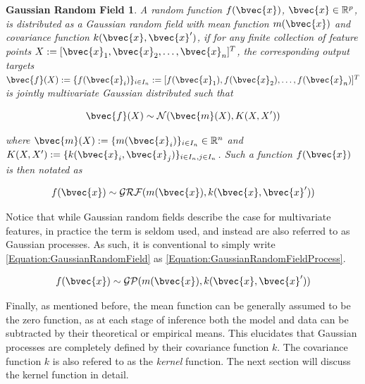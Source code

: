 			\newtheorem{grfdef}{Gaussian Random Field}[section]
			\begin{grfdef}
				A random function $f(\bvec{x})$, $\bvec{x} \in \mathbb{R}^{p}$, is distributed as a Gaussian random field with mean function $m(\bvec{x})$ and covariance function $k(\bvec{x}, \bvec{x}')$, if for any finite collection of feature points $X := [\bvec{x}_{1}, \bvec{x}_{2}, \dots, \bvec{x}_{n}]^{T}$, the corresponding output targets $\bvec{f}(X) := \{f(\bvec{x}_{i})\}_{i \in I_{n}} := [f(\bvec{x}_{1}), f(\bvec{x}_{2}), \dots, f(\bvec{x}_{n})]^{T}$ is jointly multivariate Gaussian distributed such that 

					\begin{equation}
						\bvec{f}(X) \sim \mathcal{N}(\bvec{m}(X), K(X, X'))
					\label{Equation:GaussianRandomFieldFiniteDistribution}
					\end{equation}	
				
				where $\bvec{m}(X) :=  \{m(\bvec{x}_{i})\}_{i \in I_{n}} \in \mathbb{R}^{n}$ and $K(X, X') := \{k(\bvec{x}_{i}, \bvec{x}_{j})\}_{i \in I_{n}, j \in I_{n}}$. Such a function $f(\bvec{x})$ is then notated as
				
					\begin{equation}
						f(\bvec{x}) \sim \mathcal{GRF}(m(\bvec{x}), k(\bvec{x}, \bvec{x}'))
					\label{Equation:GaussianRandomField}
					\end{equation}	
					
			\label{Definition:GaussianRandomField}
			\end{grfdef}
			
			Notice that while Gaussian random fields describe the case for multivariate features, in practice the term is seldom used, and instead are also referred to as Gaussian processes. As such, it is conventional to simply write \eqref{Equation:GaussianRandomField} as \eqref{Equation:GaussianRandomFieldProcess}.
	
				\begin{equation}
					f(\bvec{x}) \sim \mathcal{GP}(m(\bvec{x}), k(\bvec{x}, \bvec{x}'))
				\label{Equation:GaussianRandomFieldProcess}
				\end{equation}	
							
			Finally, as mentioned before, the mean function can be generally assumed to be the zero function, as at each stage of inference both the model and data can be subtracted by their theoretical or empirical means. This elucidates that Gaussian processes are completely defined by their covariance function $k$. The covariance function $k$ is also refered to as the \textit{kernel} function. The next section will discuss the kernel function in detail.
			

